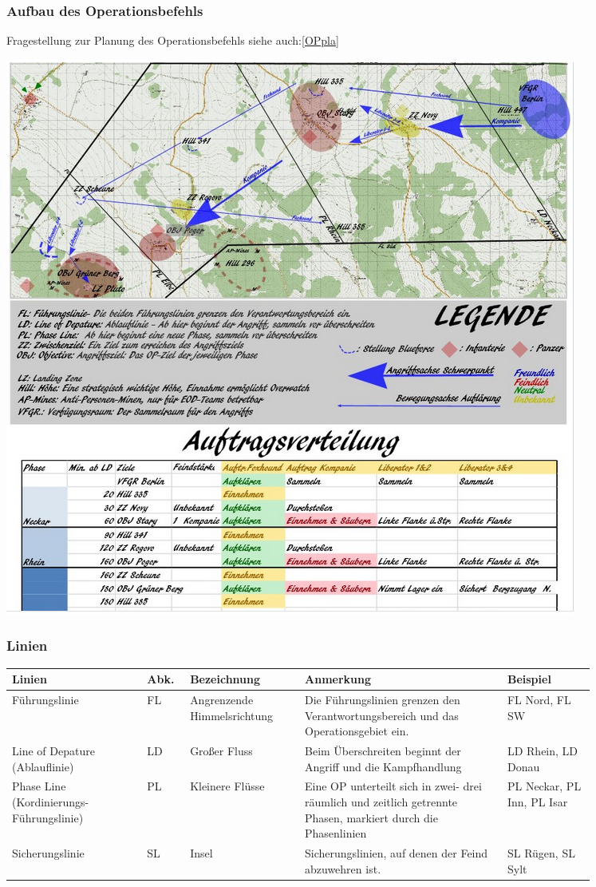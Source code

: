 \newpage

\subsubsection{Aufbau des Operationsbefehls}
\label{OPbef}
Fragestellung zur Planung des Operationsbefehls siehe auch:\ref{OPpla}

\begin{minipage}[t]{1\textwidth}
	\includegraphics[width=\textwidth]{./img/fortgeschrittenes/karteUndMarkierungen/OP-Befehl.png}
\end{minipage}

\subsubsection{Linien}
\begin{longtable}{|p{0.2\linewidth}|p{0.05\linewidth}|p{0.17\linewidth}|p{0.3\linewidth}|p{0.13\linewidth}|} 	
	\hline
	Linien	&	Abk.	&	Bezeichnung		&	Anmerkung 	&	Beispiel \\ 
	\hline
	Führungslinie	&	FL	&	Angrenzende Himmelsrichtung	&	Die Führungslinien grenzen  den Verantwortungsbereich und das Operationsgebiet ein. & FL Nord, FL SW \\ 
	\hline
	Line of Depature (Ablauflinie)	&	LD	&	Großer Fluss	&	Beim Überschreiten beginnt der Angriff und die Kampfhandlung 	&	LD Rhein, LD Donau	\\ 
	\hline
	Phase Line (Kordinierungs-Führungslinie) & PL	&	Kleinere Flüsse	&	Eine OP unterteilt sich in zwei- drei räumlich und zeitlich getrennte Phasen, markiert durch die Phasenlinien	& PL Neckar, PL Inn, PL Isar	\\ 
	\hline
	Sicherungslinie 	&	SL 	&	Insel	&	Sicherungslinien, auf denen der Feind abzuwehren ist.	&	SL Rügen, SL Sylt	\\ 
	\hline
\end{longtable}

